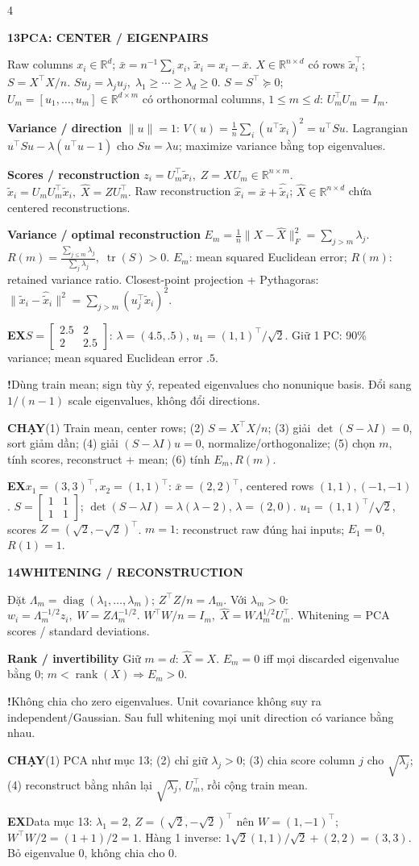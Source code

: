 \documentclass[a4paper]{article}
\newcommand{\topic}[2]{\par\addvspace{.8pt}%
  \begingroup\setlength{\fboxsep}{0.5pt}%
  \noindent\colorbox{structure}{\parbox{\dimexpr\linewidth-2\fboxsep\relax}{%
    \color{white}\fontsize{6.5}{7.1}\selectfont\bfseries #1\enspace #2}}%
  \endgroup\par\nobreak\vspace{.3pt}\nobreak}
\newcommand{\run}[1]{\key{CHẠY}#1}
\newcommand{\key}[1]{\par\textcolor{structure}{\textbf{#1}}\enspace}
\newcommand{\note}[4]{\par\begingroup\setlength{\fboxsep}{0.15pt}%
  \noindent\colorbox{#1}{\parbox{\dimexpr\linewidth-2\fboxsep\relax}{%
    \RaggedRight\textcolor{#2}{\textbf{#3}}\enspace #4}}%
  \endgroup\par}
\newcommand{\trap}[1]{\note{warningbg}{warning}{!}{#1}}
\newcommand{\ex}[1]{\note{examplebg}{example}{EX}{#1}}
\newcommand{\R}{\mathbb{R}}
\newcommand{\norm}[1]{\lVert#1\rVert}
\newcommand{\diag}{\operatorname{diag}}
\begin{document}
\begin{multicols*}{4}
\topic{13}{PCA: CENTER / EIGENPAIRS}
Raw columns $x_i\in\R^d$; $\bar x=n^{-1}\sum_ix_i$, $\tilde x_i=x_i-\bar x$. $X\in\R^{n\times d}$ có rows $\tilde x_i^\top$; $S=X^\top X/n$.
$Su_j=\lambda_ju_j,\;\lambda_1\ge\cdots\ge\lambda_d\ge0.$
$S=S^\top\succeq0$; $U_m=[u_1,\ldots,u_m]\in\R^{d\times m}$ có orthonormal columns, $1\le m\le d$:
$U_m^\top U_m=I_m.$
\key{Variance / direction} $\norm u=1$:
$V(u)=\frac1n\sum_i(u^\top\tilde x_i)^2=u^\top Su.$
Lagrangian $u^\top Su-\lambda(u^\top u-1)$ cho $Su=\lambda u$; maximize variance bằng top eigenvalues.
\key{Scores / reconstruction}
$z_i=U_m^\top\tilde x_i,\; Z=XU_m\in\R^{n\times m}.$
$\hat{\tilde x}_i=U_mU_m^\top\tilde x_i,\;\hat X=ZU_m^\top.$
Raw reconstruction $\hat x_i=\bar x+\hat{\tilde x}_i$; $\hat X\in\R^{n\times d}$ chứa centered reconstructions.
\key{Variance / optimal reconstruction}
$E_m=\frac1n\norm{X-\hat X}_F^2=\sum_{j>m}\lambda_j.$
$R(m)=\frac{\sum_{j\le m}\lambda_j}{\sum_j\lambda_j},\;\operatorname{tr}(S)>0.$
$E_m$: mean squared Euclidean error; $R(m)$: retained variance ratio. Closest-point projection + Pythagoras:
$\norm{\tilde x_i-\hat{\tilde x}_i}^2=\sum_{j>m}(u_j^\top\tilde x_i)^2.$
\ex{$S=\left[\begin{smallmatrix}2.5&2\\2&2.5\end{smallmatrix}\right]$: $\lambda=(4.5,.5)$, $u_1=(1,1)^\top/\sqrt2$. Giữ 1 PC: 90\% variance; mean squared Euclidean error $.5$.}
\trap{Dùng train mean; sign tùy ý, repeated eigenvalues cho nonunique basis. Đổi sang $1/(n-1)$ scale eigenvalues, không đổi directions.}
\run{(1) Train mean, center rows; (2) $S=X^\top X/n$; (3) giải $\det(S-\lambda I)=0$, sort giảm dần; (4) giải $(S-\lambda I)u=0$, normalize/orthogonalize; (5) chọn $m$, tính scores, reconstruct + mean; (6) tính $E_m,R(m)$.}
\ex{$x_1=(3,3)^\top,x_2=(1,1)^\top$: $\bar x=(2,2)^\top$, centered rows $(1,1),(-1,-1)$. $S=\left[\begin{smallmatrix}1&1\\1&1\end{smallmatrix}\right]$; $\det(S-\lambda I)=\lambda(\lambda-2)$, $\lambda=(2,0)$. $u_1=(1,1)^\top/\sqrt2$, scores $Z=(\sqrt2,-\sqrt2)^\top$. $m=1$: reconstruct raw đúng hai inputs; $E_1=0$, $R(1)=1$.}

\topic{14}{WHITENING / RECONSTRUCTION}
Đặt $\Lambda_m=\diag(\lambda_1,\ldots,\lambda_m)$; $Z^\top Z/n=\Lambda_m$. Với $\lambda_m>0$:
$w_i=\Lambda_m^{-1/2}z_i,\; W=Z\Lambda_m^{-1/2}.$
$W^\top W/n=I_m,\;\hat X=W\Lambda_m^{1/2}U_m^\top.$
Whitening = PCA scores / standard deviations.
\key{Rank / invertibility}
Giữ $m=d$: $\hat X=X$. $E_m=0$ iff mọi discarded eigenvalue bằng $0$; $m<\operatorname{rank}(X)\Rightarrow E_m>0$.
\trap{Không chia cho zero eigenvalues. Unit covariance không suy ra independent/Gaussian. Sau full whitening mọi unit direction có variance bằng nhau.}
\run{(1) PCA như mục 13; (2) chỉ giữ $\lambda_j>0$; (3) chia score column $j$ cho $\sqrt{\lambda_j}$; (4) reconstruct bằng nhân lại $\sqrt{\lambda_j}$, $U_m^\top$, rồi cộng train mean.}
\ex{Data mục 13: $\lambda_1=2$, $Z=(\sqrt2,-\sqrt2)^\top$ nên $W=(1,-1)^\top$; $W^\top W/2=(1+1)/2=1$. Hàng 1 inverse: $1\sqrt2(1,1)/\sqrt2+(2,2)=(3,3)$. Bỏ eigenvalue $0$, không chia cho $0$.}


\end{multicols*}
\end{document}
